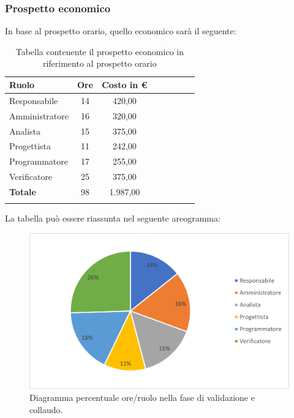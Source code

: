 			\subsubsection{Prospetto economico}
			In base al prospetto orario, quello economico sarà il seguente: 
			
			\begin{longtable}{|l|c|c|c|c|c|c|c|}
				\hline
				\rowcolor{lighter-grayer}
				\textbf{Ruolo} & \textbf{Ore} & \textbf{Costo in €} \\
				\hline
				\endfirsthead
				
				\hline
				Responsabile & 14 & 420,00\\
				\hline
				\hline
				Amministratore & 16 & 320,00\\
				\hline
				\hline
				Analista & 15 & 375,00\\
				\hline
				\hline
				Progettista & 11 & 242,00\\
				\hline
				\hline
				Programmatore & 17 & 255,00\\
				\hline
				\hline
				Verificatore & 25 & 375,00\\
				\hline
				\hline
				\textbf{Totale} & 98 & 1.987,00\\
				\hline
				\rowcolor{white}
				\caption{Tabella contenente il prospetto economico in riferimento al prospetto orario}
			\end{longtable}
			\pagebreak
		
			La tabella può essere riassunta nel seguente areogramma:
			\begin{figure}[H]
				\centering
				\includegraphics[width=0.8\linewidth]{res/images/preventivo/7-2.png}
				\caption{Diagramma percentuale ore/ruolo nella fase di validazione e collaudo.}
				\label{fig:diagramma costi ruolo fase validazione e collaudo.}
            \end{figure}
			
